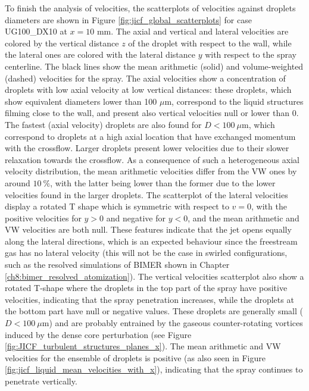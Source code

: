 To finish the analysis of velocities, the scatterplots of velocities against droplets diameters are shown in Figure \ref{fig:jicf_global_scatterplots} for case UG100\_DX10 at $x = 10$ mm. The axial and vertical and lateral velocities are colored by the vertical distance $z$ of the droplet with respect to the wall, while the lateral ones are colored with the lateral distance $y$ with respect to the spray centerline. The black lines show the mean arithmetic (solid) and volume-weighted (dashed) velocities for the spray. The axial velocities show a concentration of droplets with low axial velocity at low vertical distances: these droplets, which show equivalent diameters lower than 100 $\mu$m, correspond to the liquid structures filming close to the wall, and present also vertical velocities null or lower than 0. The fastest (axial velocity) droplets are also found for $D < 100 ~\mu$m, which correspond to droplets at a high axial location that have exchanged momentum with the crossflow. Larger droplets present lower velocities due to their slower relaxation towards the crossflow. As a consequence of such a heterogeneous axial velocity distribution, the mean arithmetic velocities differ from the VW ones by around $10~\%$, with the latter being lower than the former due to the lower velocities found in the larger droplets. The scatterplot of the lateral velocities display a rotated T shape which is symmetric with respect to $v = 0$, with the positive velocities for $y > 0$ and negative for $y < 0$, and the mean arithmetic and VW velocities are both null. These features indicate that the jet opens equally along the lateral directions, which is an expected behaviour since the freestream gas has no lateral velocity (this will not be the case in swirled configurations, such as the resolved simulations of BIMER shown in Chapter \ref{ch8:bimer_resolved_atomization}). The vertical velocities scatterplot also show a rotated T-shape where the droplets in the top part of the spray have positive velocities, indicating that the spray penetration increases, while the droplets at the bottom part have null or negative values. These droplets are generally small ($D < 100~\mu$m) and are probably entrained by the gaseous counter-rotating vortices induced by the dense core perturbation (see Figure \ref{fig:JICF_turbulent_structures_planes_x}). The mean arithmetic and VW velocities for the ensemble of droplets is positive (as also seen in Figure \ref{fig:jicf_liquid_mean_velocities_with_x}), indicating that the spray continues to penetrate vertically. 



